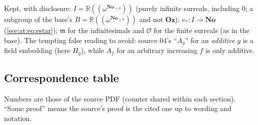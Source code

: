 \documentclass[11pt,a4paper]{article}
\numberwithin{equation}{section}
\theoremstyle{plain}
\theoremstyle{definition}
\theoremstyle{remark}
\newcommand{\No}{\mathbf{No}}
\newcommand{\Oz}{\mathbf{Oz}}
\newcommand{\R}{\mathbb{R}}
\newcommand{\NF}[1]{\R((\omega^{#1}))}
\begin{document}
\noindent Kept, with disclosure: $I=\NF{\No_{>0}}$ (purely infinite surreals,
including $0$; a subgroup of the base's $B=\NF{\No_{\ge0}}$ and not $\Oz$);
$e_*:I\to\No$ (\cref{sse:at:eq:estar}); $\mathfrak m$ for the infinitesimals
and $\mathcal O$ for the finite surreals (as in the base). The tempting
false reading to avoid: source 04's ``$A_g$'' for an \emph{additive} $g$ is a
field embedding (here $H_g$), while $A_f$ for an arbitrary increasing $f$ is
only additive.

\subsection{Correspondence table}
Numbers are those of the source PDF (counter shared within each section).
``Same proof'' means the source's proof is the cited one up to wording and
notation.
\end{document}
